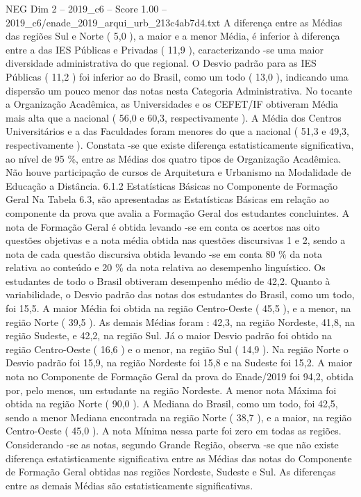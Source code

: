 \begin{textsample}{NEG Dim 2 – 2019\_c6 – Score 1.00 – 2019\_c6/enade\_2019\_arqui\_urb\_213c4ab7d4.txt}
A diferença entre as Médias das regiões Sul e Norte ( 5,0 ), a maior e a menor Média, é inferior à diferença entre a das IES Públicas e Privadas ( 11,9 ), caracterizando -se uma maior diversidade administrativa do que regional.
O Desvio padrão para as IES Públicas ( 11,2 ) foi inferior ao do Brasil, como um todo ( 13,0 ), indicando uma dispersão um pouco menor das notas nesta Categoria Administrativa.
No tocante a Organização Acadêmica, as Universidades e os CEFET/IF obtiveram Média mais alta que a nacional ( 56,0 e 60,3, respectivamente ).
A Média dos Centros Universitários e a das Faculdades foram menores do que a nacional ( 51,3 e 49,3, respectivamente ).
Constata -se que existe diferença estatisticamente significativa, ao nível de 95 \%, entre as Médias dos quatro tipos de Organização Acadêmica.
Não houve participação de cursos de Arquitetura e Urbanismo na Modalidade de Educação a Distância. 6.1.2 Estatísticas Básicas no Componente de Formação Geral Na Tabela 6.3, são apresentadas as Estatísticas Básicas em relação ao componente da prova que avalia a Formação Geral dos estudantes concluintes.
A nota de Formação Geral é obtida levando -se em conta os acertos nas oito questões objetivas e a nota média obtida nas questões discursivas 1 e 2, sendo a nota de cada questão discursiva obtida levando -se em conta 80 \% da nota relativa ao conteúdo e 20 \% da nota relativa ao desempenho linguístico.
Os estudantes de todo o Brasil obtiveram desempenho médio de 42,2.
Quanto à variabilidade, o Desvio padrão das notas dos estudantes do Brasil, como um todo, foi 15,5.
A maior Média foi obtida na região Centro-Oeste ( 45,5 ), e a menor, na região Norte ( 39,5 ).
As demais Médias foram : 42,3, na região Nordeste, 41,8, na região Sudeste, e 42,2, na região Sul.
Já o maior Desvio padrão foi obtido na região Centro-Oeste ( 16,6 ) e o menor, na região Sul ( 14,9 ).
Na região Norte o Desvio padrão foi 15,9, na região Nordeste foi 15,8 e na Sudeste foi 15,2.
A maior nota no Componente de Formação Geral da prova do Enade/2019 foi 94,2, obtida por, pelo menos, um estudante na região Nordeste.
A menor nota Máxima foi obtida na região Norte ( 90,0 ).
A Mediana do Brasil, como um todo, foi 42,5, sendo a menor Mediana encontrada na região Norte ( 38,7 ), e a maior, na região Centro-Oeste ( 45,0 ).
A nota Mínima nessa parte foi zero em todas as regiões.
Considerando -se as notas, segundo Grande Região, observa -se que não existe diferença estatisticamente significativa entre as Médias das notas do Componente de Formação Geral obtidas nas regiões Nordeste, Sudeste e Sul.
As diferenças entre as demais Médias são estatisticamente significativas.

\end{textsample}
